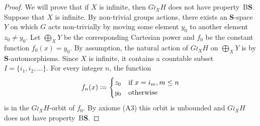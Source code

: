 \documentclass[a4paper]{article}
\theoremstyle{definition}
\newcommand*{\category}[1]{\textbf{#1}}
\newcommand*{\CatS}{\category{S}}
\newcommand*{\BS}{B\textbf{S}}
\newcommand*{\FW}{FW}
\newcommand*{\powerset}[1]{\mathcal P(#1)}
\begin{document}
\begin{proof}
We will prove that if $X$ is infinite, then $G\wr_XH$ does not have property~\BS. Suppose that $X$ is infinite.
By non-trivial groups actions, there exists an \CatS-space $Y$ on which $G$ acts non-trivially by moving some element $y_0$ to another element $z_0\neq y_0$.
Let $\bigoplus_XY$ be the corresponding Cartesian power and $f_0$ be the constant function $f_0(x)=y_0$.
By assumption, the natural action of $G\wr_XH$ on $\bigoplus_XY$ is by \CatS-automorphisms.
Since $X$ is infinite, it contains a countable subset $I=\{i_1,i_2,\dots\}$.
For every integer $n$, the function
\[
	f_n(x)\coloneqq
	\begin{cases}
		z_0 & \textnormal{if } x=i_m, m\leq n\\
		y_0 & \textnormal{otherwise}
	\end{cases}
\]
is in the $G\wr_XH$-orbit of $f_0$. By axiome (A3) this orbit is unbounded and $G\wr_XH$ does not have property~\BS.
%
%
\end{proof}
%
%
\end{document}
